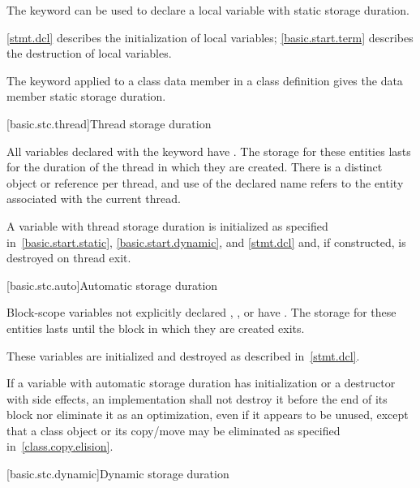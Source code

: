 \pnum
{}%
The keyword  can be used to declare a local variable with
static storage duration.
\begin{note}
\ref{stmt.dcl} describes the
initialization of local  variables; \ref{basic.start.term}
describes the destruction of local  variables.
\end{note}

\pnum
{}%
The keyword  applied to a class data member in a class
definition gives the data member static storage duration.

[basic.stc.thread]{Thread storage duration}

\pnum
All variables declared with the  keyword have
.
The storage for these entities lasts for the duration of
the thread in which they are created. There is a distinct object or reference
per thread, and use of the declared name refers to the entity associated with
the current thread.

\pnum
\begin{note}
A variable with thread storage duration is initialized as specified
in~\ref{basic.start.static}, \ref{basic.start.dynamic}, and \ref{stmt.dcl}
and, if constructed, is destroyed on thread exit.
\end{note}

[basic.stc.auto]{Automatic storage duration}

\pnum
{}%
Block-scope variables
not explicitly declared , , or  have
. The storage
for these entities lasts until the block in which they are created exits.

\pnum
\begin{note}
These variables are initialized and destroyed as described in~\ref{stmt.dcl}.
\end{note}

\pnum
If a variable with automatic storage duration has initialization or a destructor with side
effects, an implementation shall not destroy it before the end of its block
nor eliminate it as an optimization, even if it appears to be
unused, except that a class object or its copy/move may be eliminated as
specified in~\ref{class.copy.elision}.

[basic.stc.dynamic]{Dynamic storage duration}%

